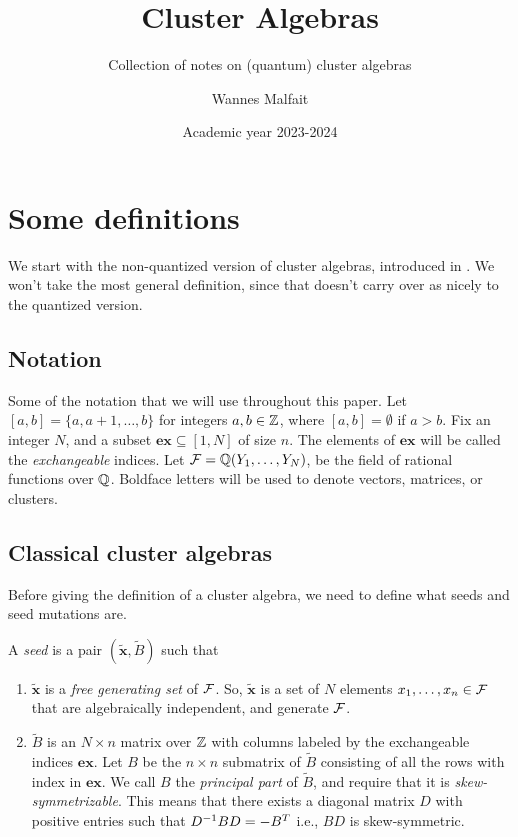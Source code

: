 \documentclass{article}
\title{Cluster Algebras}
\subtitle{Collection of notes on (quantum) cluster algebras}
\author{Wannes Malfait}
\date{Academic year 2023-2024}
\newcommand{\ex}{\mathbf{ex}}
\begin{document}
\maketitle
\newpage
\tableofcontents
\newpage

\section{Some definitions}

We start with the non-quantized version of cluster algebras,
introduced in \cite{FominZelivinsky2002CAF}.
We won't take the most general definition,
since that doesn't carry over as nicely to the quantized version.

\subsection{Notation}

Some of the notation that we will use throughout this paper.
Let $[a,b] = \{a, a+1, \dots, b\}$ for integers $a,b \in \mathbb{Z}$,
where $[a,b] = \emptyset$ if $a > b$.
Fix an integer $N$, and a subset $\ex \subseteq [1, N]$ of size $n$.
The elements of $\ex$ will be called the \emph{exchangeable} indices.
Let $\mathcal{F} = \mathbb{Q}(Y_1, \dots, Y_N)$, be the field of rational functions over $\mathbb{Q}$.
Boldface letters will be used to denote vectors, matrices, or clusters.

\subsection{Classical cluster algebras}

Before giving the definition of a cluster algebra,
we need to define what seeds and seed mutations are.
\begin{definition}
    A \emph{seed} is a pair $(\tilde{\mathbf{x}}, \tilde{B})$ such that
    \begin{enumerate}
        \item $\tilde{\mathbf{x}}$ is a \emph{free generating set} of $\mathcal{F}$.
              So, $\tilde{\mathbf{x}}$ is a set of $N$ elements $x_1, \dots, x_n \in \mathcal{F}$ that are algebraically independent, and generate $\mathcal{F}$.
        \item $\tilde{B}$ is an $N \times n$ matrix over $\mathbb{Z}$ with columns labeled by the exchangeable
              indices $\ex$. Let $B$ be the $n \times n$ submatrix
              of $\tilde{B}$ consisting of all the rows with index in $\ex$.
              We call $B$ the \emph{principal part} of $\tilde{B}$, and require that it is \emph{skew-symmetrizable}.
              This means that there exists a diagonal matrix $D$ with positive entries
              such that $D^{-1} B D = - B^T$ i.e., $BD$ is skew-symmetric.
    \end{enumerate}
\end{definition}
\end{document}
